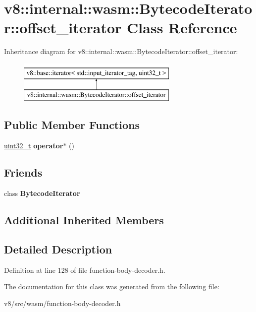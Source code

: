 \hypertarget{classv8_1_1internal_1_1wasm_1_1BytecodeIterator_1_1offset__iterator}{}\section{v8\+:\+:internal\+:\+:wasm\+:\+:Bytecode\+Iterator\+:\+:offset\+\_\+iterator Class Reference}
\label{classv8_1_1internal_1_1wasm_1_1BytecodeIterator_1_1offset__iterator}
Inheritance diagram for v8\+:\+:internal\+:\+:wasm\+:\+:Bytecode\+Iterator\+:\+:offset\+\_\+iterator\+:\begin{figure}[H]
\begin{center}
\leavevmode
\includegraphics[height=2.000000cm]{classv8_1_1internal_1_1wasm_1_1BytecodeIterator_1_1offset__iterator}
\end{center}
\end{figure}
\subsection*{Public Member Functions}
\begin{DoxyCompactItemize}
\item 
\mbox{\label{classv8_1_1internal_1_1wasm_1_1BytecodeIterator_1_1offset__iterator_a5c449ad2a7b18026101490c3c2a4963d}} 
\mbox{\hyperlink{classuint32__t}{uint32\+\_\+t}} {\bfseries operator$\ast$} ()
\end{DoxyCompactItemize}
\subsection*{Friends}
\begin{DoxyCompactItemize}
\item 
\mbox{\label{classv8_1_1internal_1_1wasm_1_1BytecodeIterator_1_1offset__iterator_a9d91d360bc42ff8afc5c981013cf9266}} 
class {\bfseries Bytecode\+Iterator}
\end{DoxyCompactItemize}
\subsection*{Additional Inherited Members}


\subsection{Detailed Description}


Definition at line 128 of file function-\/body-\/decoder.\+h.



The documentation for this class was generated from the following file\+:\begin{DoxyCompactItemize}
\item 
v8/src/wasm/function-\/body-\/decoder.\+h\end{DoxyCompactItemize}

